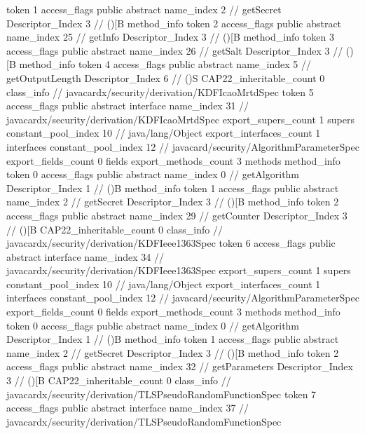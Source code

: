 {{{{{					token	1
					access_flags	public abstract
					name_index	2		// getSecret
					Descriptor_Index	3		// ()[B
				}
				method_info {
					token	2
					access_flags	public abstract
					name_index	25		// getInfo
					Descriptor_Index	3		// ()[B
				}
				method_info {
					token	3
					access_flags	public abstract
					name_index	26		// getSalt
					Descriptor_Index	3		// ()[B
				}
				method_info {
					token	4
					access_flags	public abstract
					name_index	5		// getOutputLength
					Descriptor_Index	6		// ()S
				}
			}
			CAP22_inheritable_count	0
		}
		class_info {		// javacardx/security/derivation/KDFIcaoMrtdSpec
			token	5
			access_flags	public abstract interface
			name_index	31		// javacardx/security/derivation/KDFIcaoMrtdSpec
			export_supers_count	1
			supers {
				constant_pool_index	10		// java/lang/Object
			}
			export_interfaces_count	1
			interfaces {
				constant_pool_index	12		// javacard/security/AlgorithmParameterSpec
			}
			export_fields_count	0
			fields {
			}
			export_methods_count	3
			methods {
				method_info {
					token	0
					access_flags	public abstract
					name_index	0		// getAlgorithm
					Descriptor_Index	1		// ()B
				}
				method_info {
					token	1
					access_flags	public abstract
					name_index	2		// getSecret
					Descriptor_Index	3		// ()[B
				}
				method_info {
					token	2
					access_flags	public abstract
					name_index	29		// getCounter
					Descriptor_Index	3		// ()[B
				}
			}
			CAP22_inheritable_count	0
		}
		class_info {		// javacardx/security/derivation/KDFIeee1363Spec
			token	6
			access_flags	public abstract interface
			name_index	34		// javacardx/security/derivation/KDFIeee1363Spec
			export_supers_count	1
			supers {
				constant_pool_index	10		// java/lang/Object
			}
			export_interfaces_count	1
			interfaces {
				constant_pool_index	12		// javacard/security/AlgorithmParameterSpec
			}
			export_fields_count	0
			fields {
			}
			export_methods_count	3
			methods {
				method_info {
					token	0
					access_flags	public abstract
					name_index	0		// getAlgorithm
					Descriptor_Index	1		// ()B
				}
				method_info {
					token	1
					access_flags	public abstract
					name_index	2		// getSecret
					Descriptor_Index	3		// ()[B
				}
				method_info {
					token	2
					access_flags	public abstract
					name_index	32		// getParameters
					Descriptor_Index	3		// ()[B
				}
			}
			CAP22_inheritable_count	0
		}
		class_info {		// javacardx/security/derivation/TLSPseudoRandomFunctionSpec
			token	7
			access_flags	public abstract interface
			name_index	37		// javacardx/security/derivation/TLSPseudoRandomFunctionSpec
}}}
